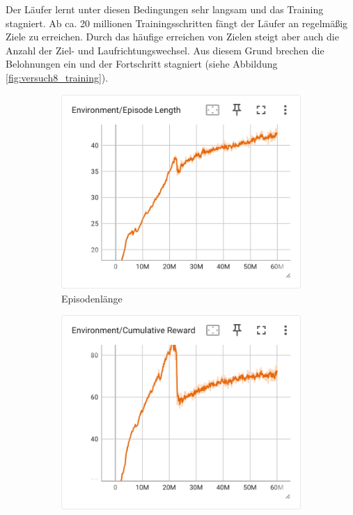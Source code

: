 Der Läufer lernt unter diesen Bedingungen sehr langsam und das Training stagniert. Ab ca. 20 millionen Trainingsschritten fängt der Läufer an regelmäßig Ziele zu erreichen. Durch das häufige erreichen von Zielen steigt aber auch die Anzahl der Ziel- und Laufrichtungswechsel. Aus diesem Grund brechen die Belohnungen ein und der Fortschritt stagniert (siehe Abbildung \ref{fig:versuch8_training}).

\begin{figure}[H]
  \centering  
  \begin{subfigure}{.49\textwidth}
      \centering  
      \includegraphics[width=\textwidth]{img/134_episode_length}
      \caption{Episodenlänge}
      \label{fig:134_episode_length}
    \end{subfigure}
    \begin{subfigure}{.49\textwidth}
      \centering  
      \includegraphics[width=\textwidth]{img/134_cumulative_reward}

\end{subfigure}
\end{figure}

